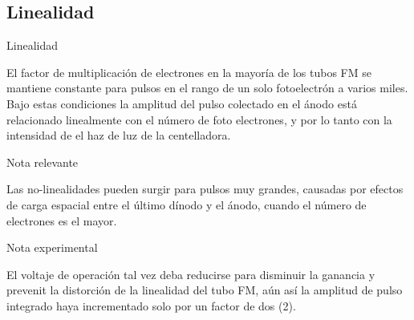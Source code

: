 \documentclass[a4paper,10pt]{beamer}
\begin{document}
\subsection{Linealidad}
\begin{frame}{Linealidad}
 
  \begin{justify}
  El factor de multiplicación de electrones en la mayoría de los tubos FM se mantiene 
  constante para pulsos en el rango de un solo fotoelectrón a varios miles. Bajo estas 
  condiciones la amplitud del pulso colectado en el ánodo está relacionado linealmente 
  con el número de foto electrones, y por lo tanto con la intensidad de el haz de 
  luz de la centelladora.
  \end{justify}
  
  \begin{block}{Nota relevante}
  \begin{justify}
   Las no-linealidades pueden surgir para pulsos muy grandes, causadas por efectos 
   de carga espacial entre el último dínodo y el ánodo, cuando el número de electrones 
   es el mayor.
   \end{justify}
  \end{block}
  
  \begin{exampleblock}{Nota experimental}
   \begin{justify}
    El voltaje de operación tal vez deba reducirse para disminuir la ganancia y prevenit 
    la distorción de la linealidad del tubo FM, aún así la amplitud de pulso integrado 
    haya incrementado solo por un factor de dos (2).
   \end{justify}
  \end{exampleblock}
 
\end{frame}
\end{document}
